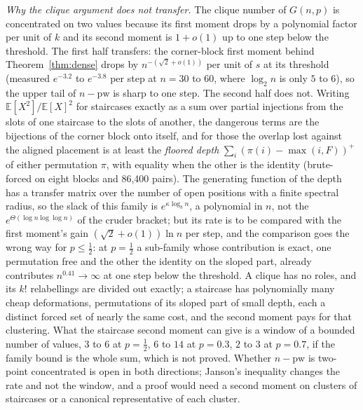 \emph{Why the clique argument does not transfer.} The clique number of
$G(n,p)$ is concentrated on two values \citep{Matula1976,BollobasErdos1976}
because its first moment drops by a polynomial factor per unit of $k$ and
its second moment is $1+o(1)$ up to one step below the threshold. The first
half transfers: the corner-block first moment behind Theorem~\ref{thm:dense}
drops by $n^{-(\sqrt2+o(1))}$ per unit of $s$ at its threshold (measured
$e^{-3.2}$ to $e^{-3.8}$ per step at $n=30$ to $60$, where $\log_{2}n$ is
only $5$ to $6$), so the upper tail of $n-\mathrm{pw}$ is sharp to one step.
The second half does not. Writing $\mathbb E[X^{2}]/\mathbb E[X]^{2}$ for
staircases exactly as a sum over partial injections from the slots of one
staircase to the slots of another, the dangerous terms are the bijections
of the corner block onto itself, and for those the overlap lost against the
aligned placement is at least the \emph{floored depth}
$\sum_{i}(\pi(i)-\max(i,F))^{+}$ of either permutation $\pi$, with equality
when the other is the identity (brute-forced on eight blocks and 86,400
pairs). The generating function of the depth has a transfer matrix over the
number of open positions with a finite spectral radius, so the slack of this
family is $e^{\kappa\log_{b}n}$, a polynomial in $n$, not the
$e^{\Theta(\log n\log\log n)}$ of the cruder bracket; but its rate is to be
compared with the first moment's gain $(\sqrt2+o(1))\ln n$ per step, and the
comparison goes the wrong way for $p\le\tfrac12$: at $p=\tfrac12$ a
sub-family whose contribution is exact, one permutation free and the other
the identity on the sloped part, already contributes $n^{0.41}\to\infty$ at
one step below the threshold. A clique has no roles, and its $k!$
relabellings are divided out exactly; a staircase has polynomially many
cheap deformations, permutations of its sloped part of small depth, each a
distinct forced set of nearly the same cost, and the second moment pays for
that clustering. What the staircase second moment can give is a window of a
bounded number of values, $3$ to $6$ at $p=\tfrac12$, $6$ to $14$ at
$p=0.3$, $2$ to $3$ at $p=0.7$, if the family bound is the whole sum, which
is not proved. Whether $n-\mathrm{pw}$ is two-point concentrated is open in
both directions; Janson's inequality changes the rate and not the window,
and a proof would need a second moment on clusters of staircases or a
canonical representative of each cluster.

